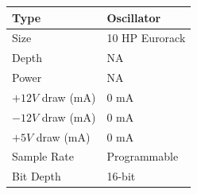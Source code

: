 \documentclass[12pt,letter]{article}
\begin{document}
\begin{table}[!htp]
\begin{tabular}{|l|l|}
\hline
Type             & Oscillator               \\
\hline
Size             & 10 HP Eurorack           \\
\hline
Depth            & NA                       \\
\hline
Power            & NA                       \\ %
\hline
$+12V$ draw (mA) & 0 mA                     \\
\hline
$-12V$ draw (mA) & 0 mA                     \\
\hline
$+5V$ draw (mA)  & 0 mA                     \\
\hline
Sample Rate      & Programmable             \\
\hline
Bit Depth        & 16-bit                   \\
\hline
\end{tabular}
\end{table}


\clearpage
\renewcommand\refname{References}
\nocite{*}


\end{document}
